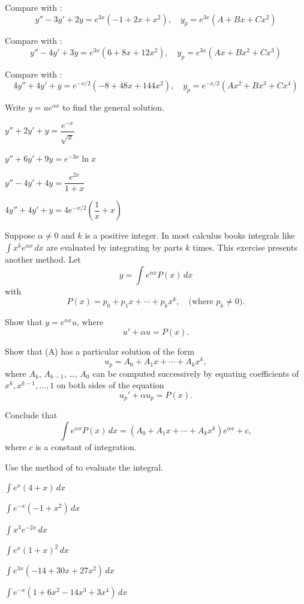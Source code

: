 \begin{exerciselist}
\item\label{exer:5.4.34}Compare with :
\[
y''-3y'+2y=e^{3x}(-1+2x+x^2),\quad y_p=e^{3x}(A+Bx+Cx^2)
\]

\item\label{exer:5.4.35}Compare with :
\[
y''-4y'+3y=e^{3x}(6+8x+12x^2),\quad y_p=e^{3x}(Ax+Bx^2+Cx^3)
\]

\item\label{exer:5.4.36}Compare with :
\[
4y''+4y'+y=e^{-x/2}(-8+48x+144x^2),\quad y_p=e^{-x/2}(Ax^2+Bx^3+Cx^4)
\]

\item\label{exer:5.4.37}Write $y=ue^{\alpha x}$ to find the general
solution.

\begin{alist*}[columns=2]
\item $y''+2y'+y=\dfrac{e^{-x}}{\sqrt x}$
\item $y''+6y'+9y=e^{-3x}\ln x$
\item $y''-4y'+4y=\dfrac{e^{2x}}{1+x}$
\item $4y''+4y'+y=4e^{-x/2}\left(\dfrac{1}{x}+x\right)$
\end{alist*}

\item\label{exer:5.4.38}Suppose $\alpha\ne0$ and $k$ is a positive integer. In most
calculus books integrals like $\int x^k e^{\alpha x}\,dx$ are
evaluated by integrating by parts $k$ times. This exercise presents
another method. Let
\[
y=\int e^{\alpha x}P(x)\,dx
\]
with
\[
P(x)=p_0+p_1x+\cdots+p_kx^k, \quad\text{(where $p_k\ne0$)}.
\]
\begin{alist}
\item %
Show that $y=e^{\alpha x}u$, where
\[
u'+\alpha u=P(x).
\tag{A}
\]
\item %
Show that  (A) has a particular solution of the form
\[
u_p=A_0+A_1x+\cdots+A_kx^k,
\]
where $A_k$, $A_{k-1}$, \dots, $A_0$ can be computed successively
by equating coefficients of $x^k,x^{k-1}, \dots,1$ on both sides of the
equation
\[
u_p'+\alpha u_p=P(x).
\]
\item %
Conclude that
\[
\int e^{\alpha x}P(x)\,dx=\left(A_0+A_1x+\cdots+A_kx^k\right)e^{\alpha x}
+c,
\]
where $c$ is a constant of integration.
\end{alist}

\item\label{exer:5.4.39}Use the method of  to evaluate the integral.

\begin{alist*}[columns=2]
\item $\int e^x(4+x)\,dx$
\item $\int e^{-x}(-1+x^2)\,dx$
\item $\int x^3e^{-2x}\,dx$
\item $\int e^x(1+x)^2\,dx$
\item $\int e^{3x}(-14+30x+27x^2)\,dx$
\item $\int e^{-x}(1+6x^2-14x^3+3x^4)\,dx$
\end{alist*}


\end{exerciselist}
